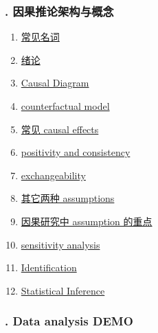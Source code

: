 \documentclass[11pt]{article}
\begin{document}
\vspace{-1cm}

\subsubsection*{. 因果推论架构与概念}

\vspace{-0.5cm}

\begin{multicols}{2}
	\begin{enumerate}
		\item \href{https://mp.weixin.qq.com/s/tBHwHv3gQdgX2lKMJfHpcA}{常见名词}	%
		\item \href{https://mp.weixin.qq.com/s/6F7J_KaNsKEnnQF3M1peJQ}{绪论}	%
		\item \href{https://mp.weixin.qq.com/s/gsIw1zhrvkF2dZnxNKzoEA}{Causal Diagram}	%
		\item \href{https://mp.weixin.qq.com/s/FC3qJ9acrJZbV208v17UTA}{counterfactual model}	%
		\item \href{https://mp.weixin.qq.com/s/q-xD8pj2bM2RfD67PlEPmA}{常见 causal effects}	%
		\item \href{https://mp.weixin.qq.com/s/yiZLG7CQsUCsek88vNz39A}{positivity and consistency}	%
		\item \href{https://mp.weixin.qq.com/s/BgCtclwJsd_vJlFuppHiIQ}{exchangeability}	%
		\item \href{https://mp.weixin.qq.com/s/aeflhUV9ooP80hSoPtd4Ew}{其它两种 assumptions}	%
		\item \href{https://mp.weixin.qq.com/s/tjGhDj2vW7btp9_mpH7fsQ}{因果研究中 assumption 的重点}	%
		\item \href{https://mp.weixin.qq.com/s/ygs4MYKA3s-eZnrO7q6GSA}{sensitivity analysis}	%
		\item \href{https://mp.weixin.qq.com/s/Lwy0ZgNU9E-m7xtYjEwZYA}{Identification}	%
		\item \href{https://mp.weixin.qq.com/s/6XFNSn2uEQhJVoqj2zfbvQ}{Statistical Inference}	%
	\end{enumerate}
\end{multicols}

\vspace{-1cm}

\subsubsection*{. Data analysis DEMO}

\vspace{-0.5cm}
\end{document}

